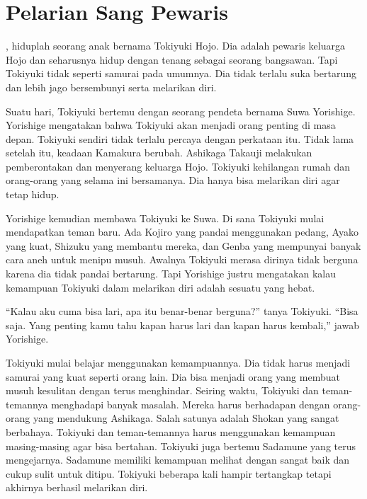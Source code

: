 \chapter*{Pelarian Sang Pewaris}

, hiduplah seorang anak bernama Tokiyuki Hojo. Dia adalah pewaris keluarga Hojo dan seharusnya hidup dengan tenang sebagai seorang bangsawan. Tapi Tokiyuki tidak seperti samurai pada umumnya. Dia tidak terlalu suka bertarung dan lebih jago bersembunyi serta melarikan diri.

Suatu hari, Tokiyuki bertemu dengan seorang pendeta bernama Suwa Yorishige. Yorishige mengatakan bahwa Tokiyuki akan menjadi orang penting di masa depan. Tokiyuki sendiri tidak terlalu percaya dengan perkataan itu. Tidak lama setelah itu, keadaan Kamakura berubah. Ashikaga Takauji melakukan pemberontakan dan menyerang keluarga Hojo. Tokiyuki kehilangan rumah dan orang-orang yang selama ini bersamanya. Dia hanya bisa melarikan diri agar tetap hidup.

Yorishige kemudian membawa Tokiyuki ke Suwa. Di sana Tokiyuki mulai mendapatkan teman baru. Ada Kojiro yang pandai menggunakan pedang, Ayako yang kuat, Shizuku yang membantu mereka, dan Genba yang mempunyai banyak cara aneh untuk menipu musuh. Awalnya Tokiyuki merasa dirinya tidak berguna karena dia tidak pandai bertarung. Tapi Yorishige justru mengatakan kalau kemampuan Tokiyuki dalam melarikan diri adalah sesuatu yang hebat.

``Kalau aku cuma bisa lari, apa itu benar-benar berguna?'' tanya Tokiyuki.
``Bisa saja. Yang penting kamu tahu kapan harus lari dan kapan harus kembali,'' jawab Yorishige.

Tokiyuki mulai belajar menggunakan kemampuannya. Dia tidak harus menjadi samurai yang kuat seperti orang lain. Dia bisa menjadi orang yang membuat musuh kesulitan dengan terus menghindar. Seiring waktu, Tokiyuki dan teman-temannya menghadapi banyak masalah. Mereka harus berhadapan dengan orang-orang yang mendukung Ashikaga. Salah satunya adalah Shokan yang sangat berbahaya. Tokiyuki dan teman-temannya harus menggunakan kemampuan masing-masing agar bisa bertahan. Tokiyuki juga bertemu Sadamune yang terus mengejarnya. Sadamune memiliki kemampuan melihat dengan sangat baik dan cukup sulit untuk ditipu. Tokiyuki beberapa kali hampir tertangkap tetapi akhirnya berhasil melarikan diri.

